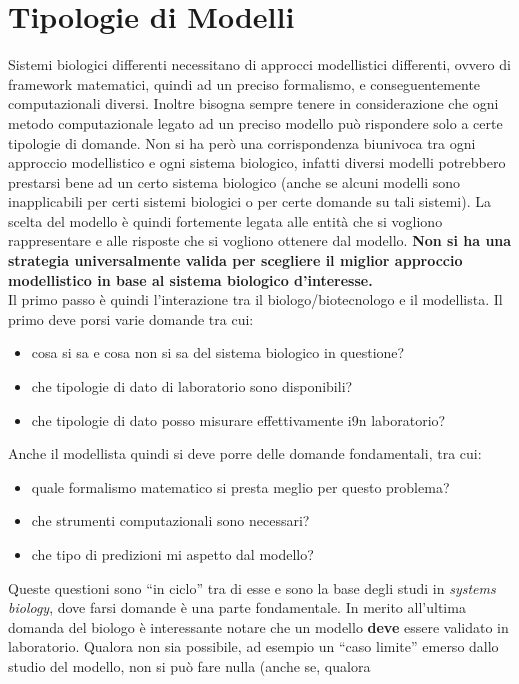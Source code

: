 \documentclass[a4paper,12pt, oneside]{book}
\begin{document}
\section{Tipologie di Modelli}
Sistemi biologici differenti necessitano di approcci modellistici differenti,
ovvero di framework matematici, quindi ad un preciso formalismo, e
conseguentemente computazionali diversi. Inoltre bisogna sempre tenere in
considerazione che ogni metodo computazionale legato ad un preciso modello può
rispondere solo a certe tipologie di domande. Non si ha però una corrispondenza
biunivoca tra ogni approccio modellistico e ogni sistema biologico, infatti
diversi modelli potrebbero prestarsi bene ad un certo sistema biologico (anche
se alcuni modelli sono inapplicabili per certi sistemi biologici o per certe
domande su tali sistemi). La scelta del modello è quindi fortemente legata alle
entità che si vogliono rappresentare e alle risposte che si vogliono ottenere
dal modello. \textbf{Non si ha una strategia universalmente valida per scegliere
il miglior approccio modellistico in base al sistema biologico d'interesse.}\\
Il primo passo è quindi l'interazione tra il biologo/biotecnologo e il
modellista. Il primo deve porsi varie domande tra cui:
\begin{itemize}
  \item cosa si sa e cosa non si sa del sistema biologico in questione?
  \item che tipologie di dato di laboratorio sono disponibili?
  \item che tipologie di dato posso misurare effettivamente i9n laboratorio? 
\end{itemize}
Anche il modellista quindi si deve porre delle domande fondamentali, tra cui:
\begin{itemize}
  \item quale formalismo matematico si presta meglio per questo problema?
  \item che strumenti computazionali sono necessari?
  \item che tipo di predizioni mi aspetto dal modello?
\end{itemize}
Queste questioni sono ``in ciclo'' tra di esse e sono la base degli studi in
\textit{systems biology}, dove farsi domande è una parte fondamentale. In merito
all'ultima domanda del biologo è 
interessante notare che un modello \textbf{deve} essere validato in
laboratorio. Qualora non sia possibile, ad esempio un ``caso limite'' emerso
dallo studio del modello, non si può fare nulla (anche se, qualora
\end{document}
